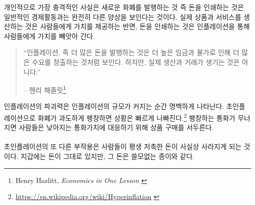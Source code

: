 개인적으로 가장 충격적인 사실은 
새로운 화폐를 발행하는 것 즉 돈을 인쇄하는 것은 일반적인 경제활동과는 완전히 다른 양상을 보인다는 것이다. 
실제 상품과 서비스를 생산하는 것은 사람들에게 가치를 제공하는 반면, 
돈을 인쇄하는 것은 인플레이션을 통해 사람들에게 가치를 빼앗아 간다.

\begin{quotation}\begin{samepage}
\enquote{인플레이션, 즉 더 많은 돈을 발행하는 것은 더 높은 임금과 물가로 인해 더 많은 수요를 창출하는 것처럼 보인다.
하지만, 실제 생산과 거래가 생기는 것은 아니다.}
\begin{flushright} -- 헨리 해즐릿\footnote{Henry Hazlitt, \textit{Economics in One Lesson} \cite{hazlitt}}
\end{flushright}\end{samepage}\end{quotation}

인플레이션의 파괴력은 인플레이션의 규모가 커지는 순간 명백하게 나타난다. 
초인플레이션으로 화폐가 과도하게 팽창하면 상황은 빠르게 나빠진다.\footnote{\url{https://en.wikipedia.org/wiki/Hyperinflation}
\cite{wiki:hyperinflation}} 
팽창하는 통화가 무너지면 사람들은 낮아지는 통화가치에 대응하기 위해 상품 구매를 서두른다.

\paragraph{}
초인플레이션의 또 다른 부작용은 사람들이 평생 저축한 돈이 사실상 사라지게 되는 것이다. 
지갑에는 돈이 그대로 있지만, 그 돈은 쓸모없는 종이와 같다.

